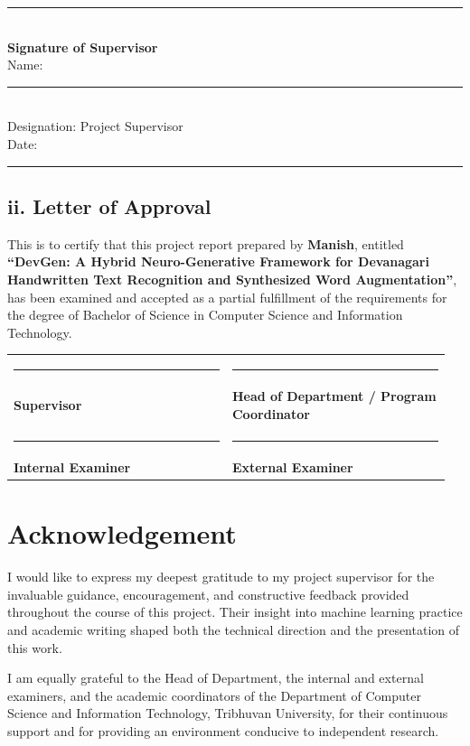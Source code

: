 \documentclass[12pt,a4paper]{report}
\newcommand{\HRule}{\rule{0.35\linewidth}{0.4pt}}
\begin{document}
\vspace{2cm}
\noindent\HRule\\
\textbf{Signature of Supervisor}\\[4pt]
Name: \HRule\\[4pt]
Designation: Project Supervisor\\[4pt]
Date: \HRule

\section*{ii. Letter of Approval}
This is to certify that this project report prepared by \textbf{Manish}, entitled \textbf{``DevGen: A Hybrid Neuro-Generative Framework for Devanagari Handwritten Text Recognition and Synthesized Word Augmentation''}, has been examined and accepted as a partial fulfillment of the requirements for the degree of Bachelor of Science in Computer Science and Information Technology.

\vspace{1.6cm}
\noindent
\begin{tabular}{p{0.48\linewidth}p{0.48\linewidth}}
\HRule & \HRule \\
\textbf{Supervisor} & \textbf{Head of Department / Program Coordinator} \\[1.4cm]
\HRule & \HRule \\
\textbf{Internal Examiner} & \textbf{External Examiner} \\
\end{tabular}

\chapter*{Acknowledgement}

I would like to express my deepest gratitude to my project supervisor for the invaluable guidance, encouragement, and constructive feedback provided throughout the course of this project. Their insight into machine learning practice and academic writing shaped both the technical direction and the presentation of this work.

I am equally grateful to the Head of Department, the internal and external examiners, and the academic coordinators of the Department of Computer Science and Information Technology, Tribhuvan University, for their continuous support and for providing an environment conducive to independent research.
\end{document}
